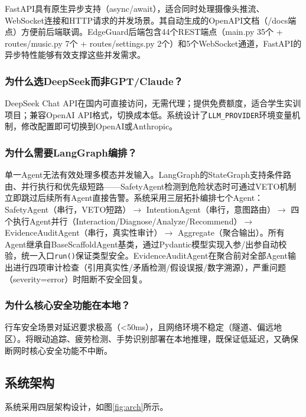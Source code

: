 \documentclass[a4paper]{article}
\begin{document}
FastAPI具有原生异步支持（async/await），适合同时处理摄像头推流、WebSocket连接和HTTP请求的并发场景。其自动生成的OpenAPI文档（/docs端点）方便前后端联调。EdgeGuard后端包含44个REST端点（main.py 35个 + routes/music.py 7个 + routes/settings.py 2个）和5个WebSocket通道，FastAPI的异步特性能够有效支撑这些并发需求。

\subsubsection{为什么选DeepSeek而非GPT/Claude？}

DeepSeek Chat API在国内可直接访问，无需代理；提供免费额度，适合学生实训项目；兼容OpenAI API格式，切换成本低。系统设计了\texttt{LLM\_PROVIDER}环境变量机制，修改配置即可切换到OpenAI或Anthropic。

\subsubsection{为什么需要LangGraph编排？}

单一Agent无法有效处理多模态并发输入。LangGraph的StateGraph支持条件路由、并行执行和优先级短路——SafetyAgent检测到危险状态时可通过VETO机制立即跳过后续所有Agent直接告警。系统采用三层拓扑编排七个Agent：SafetyAgent（串行，VETO短路）$\rightarrow$ IntentionAgent（串行，意图路由）$\rightarrow$ 四个执行Agent并行（Interaction/Diagnose/Analyze/Recommend）$\rightarrow$ EvidenceAuditAgent（串行，真实性审计）$\rightarrow$ Aggregate（聚合输出）。所有Agent继承自BaseScaffoldAgent基类，通过Pydantic模型实现入参/出参自动校验，统一入口\texttt{run()}保证类型安全。EvidenceAuditAgent在聚合前对全部Agent输出进行四项审计检查（引用真实性/矛盾检测/假设误报/数字溯源），严重问题（severity=error）时阻断不安全回复。

\subsubsection{为什么核心安全功能在本地？}

行车安全场景对延迟要求极高（<50ms），且网络环境不稳定（隧道、偏远地区）。将眼动追踪、疲劳检测、手势识别部署在本地推理，既保证低延迟，又确保断网时核心安全功能不中断。

\subsection{系统架构}

系统采用四层架构设计，如图\ref{fig:arch}所示。
\end{document}
